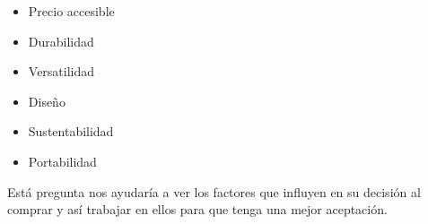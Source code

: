 
\begin{itemize}
    \item Precio accesible
    \item Durabilidad
    \item Versatilidad
    \item Diseño
    \item Sustentabilidad
    \item Portabilidad
\end{itemize}

Está pregunta nos ayudaría a ver los factores que influyen en su decisión al comprar y así trabajar en ellos para que tenga una mejor aceptación.